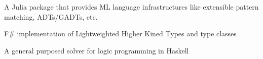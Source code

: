 \documentclass{resume}
\begin{document}
A Julia package that provides ML language infrastructures like extensible pattern matching, ADTs/GADTs, etc.

F\# implementation of Lightweighted Higher Kined Types and type classes

A general purposed solver for logic programming in Haskell
\end{document}
